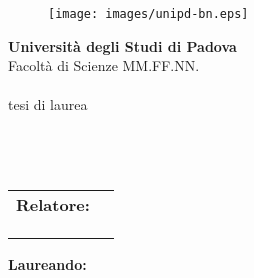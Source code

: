 %
%
\begin{titlepage}
  \begin{center}
     \begin{figure}[h]
        \centering
        \texttt{[image: images/unipd-bn.eps]}
     \end{figure}
    {\Large \bf Universit\`a degli Studi di Padova}\\
    \vspace{0.2cm}
    {\large Facolt\`a di Scienze MM.FF.NN.}\\
    \vspace{0.2cm}
    {\ifthenelse{\equal{\GMCourse}{}} {\mbox{}} {\GMCourse{} } }\\
    \vspace{2cm}
    {tesi di laurea\\ 
    \vspace{1cm}}
    {\Huge \bf \GMTitle{} }\\
    \vspace{.5cm}
    {{\ifthenelse{\equal{\GMSubtitle}{}}
        { \mbox{}\\ }%
        { {\LARGE \sf \bf  \GMSubtitle{} \\ }} %
    }}%
  \end{center}
  \vspace{4cm}
  \begin{flushleft}
     \begin{tabular}{ll}
       {\bf Relatore:} & \GMAdvisor{}\\
        \ifthenelse{\equal{\GMCoAdvisor}{}} %
           {\mbox{} \tabularnewline }%
           {{\bf \large Correlatore: } & \GMCoAdvisor{} \tabularnewline }
     \end{tabular}
  \end{flushleft}
  \vspace{1cm}
  \begin{flushright}
    {\bf Laureando:}  \GMAuthor{}
  \end{flushright}
  \vspace{1cm}
  \begin{center}
    {\small \GMDate{}}
  \end{center}%
\end{titlepage}%
